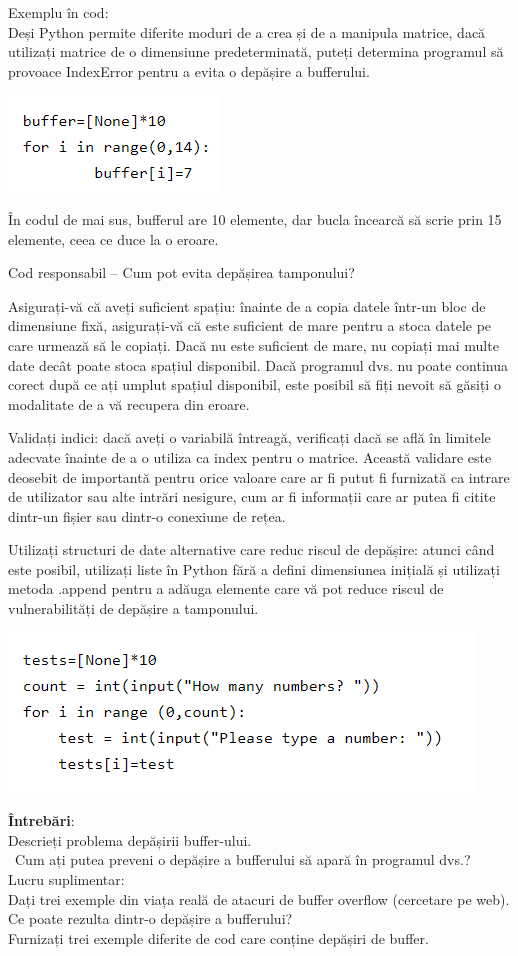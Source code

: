 \documentclass[oneside,20pt]{article}          %
\begin{document}
Exemplu în cod:\\
Deși Python permite diferite moduri de a crea și de a manipula matrice, dacă utilizați matrice de o dimensiune predeterminată, puteți determina programul să provoace IndexError pentru a evita o depășire a bufferului.\\

\begin{center}
\includegraphics[height = 2 cm]{1.png}
\end{center}
 
În codul de mai sus, bufferul are 10 elemente, dar bucla încearcă să scrie prin 15 elemente, ceea ce duce la o eroare.

Cod responsabil – Cum pot evita depășirea tamponului?

Asigurați-vă că aveți suficient spațiu: înainte de a copia datele într-un bloc de dimensiune fixă, asigurați-vă că este suficient de mare pentru a stoca datele pe care urmează să le copiați. Dacă nu este suficient de mare, nu copiați mai multe date decât poate stoca spațiul disponibil. Dacă programul dvs. nu poate continua corect după ce ați umplut spațiul disponibil, este posibil să fiți nevoit să găsiți o modalitate de a vă recupera din eroare.

Validați indici: dacă aveți o variabilă întreagă, verificați dacă se află în limitele adecvate înainte de a o utiliza ca index pentru o matrice. Această validare este deosebit de importantă pentru orice valoare care ar fi putut fi furnizată ca intrare de utilizator sau alte intrări nesigure, cum ar fi informații care ar putea fi citite dintr-un fișier sau dintr-o conexiune de rețea.

Utilizați structuri de date alternative care reduc riscul de depășire: atunci când este posibil, utilizați liste în Python fără a defini dimensiunea inițială și utilizați metoda .append pentru a adăuga elemente care vă pot reduce riscul de vulnerabilități de depășire a tamponului.
\begin{center}
\includegraphics[height = 2 cm]{2.png}
\end{center}
\textbf{Întrebări}:\\
Descrieți problema depășirii buffer-ului.\\\
Cum ați putea preveni o depășire a bufferului să apară în programul dvs.?\\
Lucru suplimentar:\\
Dați trei exemple din viața reală de atacuri de buffer overflow (cercetare pe web).\\
Ce poate rezulta dintr-o depășire a bufferului?\\
Furnizați trei exemple diferite de cod care conține depășiri de buffer.\\
\end{document}
